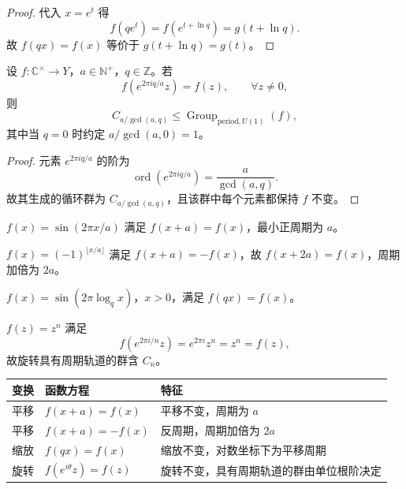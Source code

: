 \begin{proof}
代入 $x=e^t$ 得
\[
f(qe^t)=f(e^{t+\ln q})=g(t+\ln q).
\]
故 $f(qx)=f(x)$ 等价于 $g(t+\ln q)=g(t)$。
\end{proof}

\begin{proposition}[旋转对称与单位根阶]\label{prop:rotation_unit_root_order}
设 $f:\mathbb{C}^\times\to Y$，$a\in\mathbb{N}^+$，$q\in\mathbb{Z}$。若
\[
f(e^{2\pi i q/a}z)=f(z),\qquad \forall z\neq 0,
\]
则
\[
C_{a/\gcd(a,q)}\le \operatorname{Group}_{\mathrm{period},U(1)}(f),
\]
其中当 $q=0$ 时约定 $a/\gcd(a,0)=1$。
\end{proposition}

\begin{proof}
元素 $e^{2\pi i q/a}$ 的阶为
\[
\operatorname{ord}\!\left(e^{2\pi i q/a}\right)=\frac{a}{\gcd(a,q)}.
\]
故其生成的循环群为 $C_{a/\gcd(a,q)}$，且该群中每个元素都保持 $f$ 不变。
\end{proof}

\begin{example}[平移对称]\label{ex:translation_symmetric}
$f(x)=\sin(2\pi x/a)$ 满足 $f(x+a)=f(x)$，最小正周期为 $a$。
\end{example}

\begin{example}[反周期]\label{ex:antiperiod}
$f(x)=(-1)^{\lfloor x/a\rfloor}$ 满足 $f(x+a)=-f(x)$，故 $f(x+2a)=f(x)$，周期加倍为 $2a$。
\end{example}

\begin{example}[缩放对称]\label{ex:scaling_symmetric}
$f(x)=\sin(2\pi\log_q x)$，$x>0$，满足 $f(qx)=f(x)$。
\end{example}

\begin{example}[旋转对称]\label{ex:rotation_symmetric}
$f(z)=z^n$ 满足
\[
f(e^{2\pi i/n}z)=e^{2\pi i}z^n=z^n=f(z),
\]
故旋转具有周期轨道的群含 $C_n$。
\end{example}

\begin{remark}[三种变换的函数特征对照]\label{rem:three_transformations_function_features}
\begin{center}
\begin{tabular}{@{}p{2.2cm}p{5.2cm}p{5.0cm}@{}}
\toprule
变换 & 函数方程 & 特征 \\
\midrule
平移 & $f(x+a)=f(x)$ & 平移不变，周期为 $a$ \\
平移 & $f(x+a)=-f(x)$ & 反周期，周期加倍为 $2a$ \\
缩放 & $f(qx)=f(x)$ & 缩放不变，对数坐标下为平移周期 \\
旋转 & $f(e^{i\theta}z)=f(z)$ & 旋转不变，具有周期轨道的群由单位根阶决定 \\
\bottomrule
\end{tabular}
\end{center}
\end{remark}

